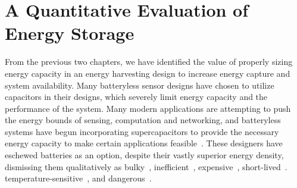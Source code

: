 \chapter{A Quantitative Evaluation of Energy Storage}
\label{chap:battery}

From the previous two chapters, we have identified the value of properly sizing energy capacity in an energy harvesting design to increase energy capture and system availability. 
Many batteryless sensor designs have chosen to utilize capacitors in their designs, which severely limit energy capacity and the performance of the system. 
Many modern applications are attempting to push the energy bounds of sensing, computation and networking, and batteryless systems have begun incorporating supercapacitors to provide the necessary energy capacity to make certain applications feasible~\cite{nardello2019camaroptera}.
These designers have eschewed batteries as an option, despite their vastly superior energy density, dismissing them qualitatively as 
bulky~\cite{yervaGrafting12, hester2017future, hesterTragedy15, luciaIntermittent17, hesterFlicker17, hesterTimely17, colinReconfigurable18, yildirim2018ink, nardello2019camaroptera, geissdoerfer2019shepherd, majid2020continuous, shukla2019skinnypower},
inefficient~\cite{yervaGrafting12, luciaIntermittent17, nardello2019camaroptera, shukla2019skinnypower},
expensive~\cite{hester2017future, hesterTragedy15, hesterFlicker17, hesterTimely17, yildirim2018ink, majid2020continuous},
short-lived~\cite{hester2017future, hesterFlicker17, hesterTimely17, colinReconfigurable18, luciaIntermittent17, yervaGrafting12, shukla2019skinnypower, geissdoerfer2019shepherd, nardello2019camaroptera, fraternali2020ember, majid2020continuous}.
temperature-sensitive~\cite{hester2017future, hesterFlicker17, hesterTimely17, luciaIntermittent17, colinReconfigurable18},
and dangerous~\cite{hester2017future, hesterFlicker17, hesterTimely17,  yildirim2018ink, geissdoerfer2019shepherd, majid2020continuous}. 

